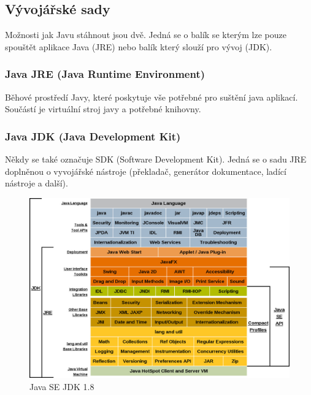 \subsection{Vývojářské sady}
Možnosti jak Javu stáhnout jsou dvě. Jedná se o balík se kterým lze pouze spouštět aplikace Java (JRE) nebo balík který slouží pro vývoj (JDK).

\subsubsection{Java JRE (Java Runtime Environment)}
Běhové prostředí Javy, které poskytuje vše potřebné pro suštění java aplikací. Součástí je virtuální stroj javy a potřebné knihovny.

\subsubsection{Java JDK (Java Development Kit)}
Někdy se také označuje SDK (Software Development Kit). Jedná se o sadu JRE doplněnou o vyvojářské nástroje (překladač, generátor dokumentace, ladící nástroje a další).

\begin{figure}[h!]
    \centering
    \includegraphics[scale=0.3]{fig/java_jdk.jpg}
    \caption{Java SE JDK 1.8}
\end{figure}





